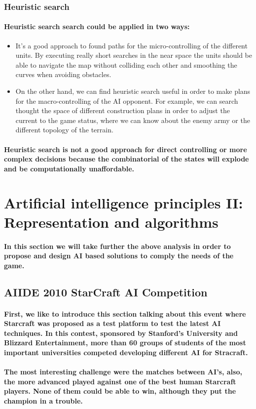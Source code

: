 \documentclass[a4paper,10pt]{article}
\newcommand{\p}[1]{\paragraph{\indent\textnormal{#1}}}
\begin{document}
  \subsubsection{Heuristic search}

    \p{Heuristic search search could be applied in two ways:}

    \begin{itemize}
     \item It's a good approach to found paths for the micro-controlling of the different units. By executing really short searches in the near space the units should be able to navigate the map without colliding each other and smoothing the curves when avoiding obstacles.
     \item On the other hand, we can find heuristic search useful in order to make plans for the macro-controlling of the AI opponent. For example, we can search thought the space of different construction plans in order to adjust the current to the game status, where we can know about the enemy army or the different topology of the terrain.
    \end{itemize}

  \p{Heuristic search is not a good approach for direct controlling or more complex decisions because the combinatorial of the states will explode and be computationally unaffordable.}

\newpage
\section{Artificial intelligence principles II: Representation and algorithms}

    \p{In this section we will take further the above analysis in order to propose and design AI based solutions to comply the needs of the game.}

    \subsection{AIIDE 2010 StarCraft AI Competition}

      \p{First, we like to introduce this section talking about this event where Starcraft was proposed as a test platform to test the latest AI techniques. In this contest, sponsored by Stanford's University and Blizzard Entertainment, more than 60 groups of students of the most important universities competed developing different AI for Stracraft.}

      \p{The most interesting challenge were the matches between AI's, also, the more advanced played against one of the best human Starcraft players. None of them could be able to win, although they put the champion in a trouble.}
\end{document}
